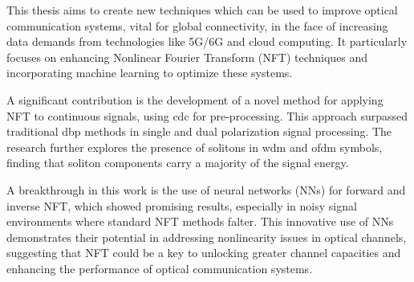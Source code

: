 This thesis aims to create new techniques which can be used to improve optical communication systems, vital for global connectivity, in the face of increasing data demands from technologies like 5G/6G and cloud computing. It particularly focuses on enhancing Nonlinear Fourier Transform (NFT) techniques and incorporating machine learning to optimize these systems.

A significant contribution is the development of a novel method for applying NFT to continuous signals, using \acrfull{cdc} for pre-processing. This approach surpassed traditional \acrfull{dbp} methods in single and dual polarization signal processing. The research further explores the presence of solitons in \gls{wdm} and \gls{ofdm} symbols, finding that soliton components carry a majority of the signal energy.

A breakthrough in this work is the use of neural networks (NNs) for forward and inverse NFT, which showed promising results, especially in noisy signal environments where standard NFT methods falter. This innovative use of NNs demonstrates their potential in addressing nonlinearity issues in optical channels, suggesting that NFT could be a key to unlocking greater channel capacities and enhancing the performance of optical communication systems.



    
    
    
    

